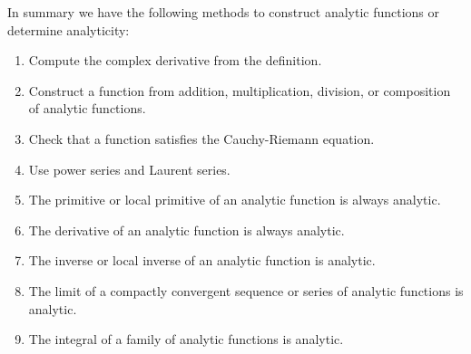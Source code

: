 In summary we have the following methods to construct analytic
functions or determine analyticity:
\begin{enumerate}
  \item{
    Compute the complex derivative from the definition.
  }
  \item{
    Construct a function from addition, multiplication, division, or
    composition of analytic functions.
  }
  \item{
    Check that a function satisfies the Cauchy-Riemann equation.
  }
  \item{
    Use power series and Laurent series.
  }
  \item{
    The primitive or local primitive of an analytic function is always analytic.
  }
  \item{
    The derivative of an analytic function is always analytic.
  }
  \item{
    The inverse or local inverse of an analytic function is analytic.
  }
  \item{
    The limit of a compactly convergent sequence or series of analytic
    functions is analytic.
  }
  \item{
    The integral of a family of analytic functions is analytic.
  }
\end{enumerate}